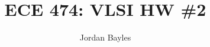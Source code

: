 \documentclass[12pt,letterpaper]{article}
\author{Jordan Bayles}
\title{ECE 474: VLSI HW \#2}
\makeatletter
\let\thetitle\@title
\let\theauthor\@author
\let\thedate\@date
\makeatother
\begin{document}
\begin{flushright}
\theauthor\\
\thedate
\end{flushright}
\begin{center}
\thetitle
\end{center}







\end{document}
